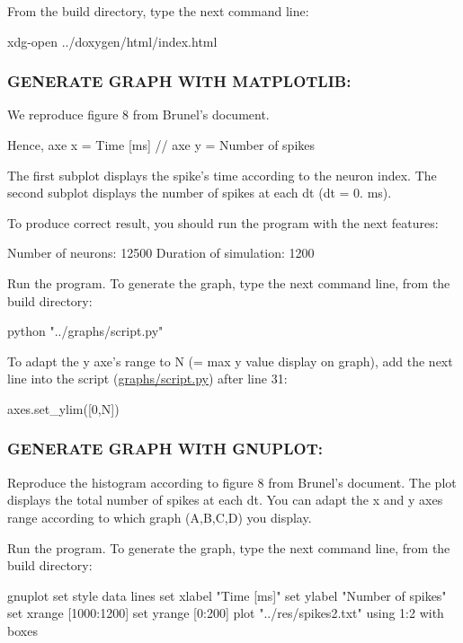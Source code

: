 From the build directory, type the next command line\-: \begin{DoxyVerb}    xdg-open ../doxygen/html/index.html
\end{DoxyVerb}


\subsubsection*{G\-E\-N\-E\-R\-A\-T\-E G\-R\-A\-P\-H W\-I\-T\-H M\-A\-T\-P\-L\-O\-T\-L\-I\-B\-:}

We reproduce figure 8 from Brunel's document.

Hence, axe x = Time \mbox{[}ms\mbox{]} // axe y = Number of spikes

The first subplot displays the spike's time according to the neuron index. The second subplot displays the number of spikes at each dt (dt = 0. ms).

To produce correct result, you should run the program with the next features\-: \begin{DoxyVerb}    Number of neurons: 12500
    Duration of simulation: 1200
\end{DoxyVerb}


Run the program. To generate the graph, type the next command line, from the build directory\-: \begin{DoxyVerb}    python "../graphs/script.py"
\end{DoxyVerb}


To adapt the y axe's range to N (= max y value display on graph), add the next line into the script (\hyperlink{script_8py}{graphs/script.\-py}) after line 31\-: \begin{DoxyVerb}    axes.set_ylim([0,N])
\end{DoxyVerb}


\subsubsection*{G\-E\-N\-E\-R\-A\-T\-E G\-R\-A\-P\-H W\-I\-T\-H G\-N\-U\-P\-L\-O\-T\-:}

Reproduce the histogram according to figure 8 from Brunel's document. The plot displays the total number of spikes at each dt. You can adapt the x and y axes range according to which graph (A,B,C,D) you display.

Run the program. To generate the graph, type the next command line, from the build directory\-: \begin{DoxyVerb}    gnuplot
    set style data lines
    set xlabel "Time [ms]"
    set ylabel "Number of spikes"
    set xrange [1000:1200]
    set yrange [0:200]
    plot "../res/spikes2.txt" using 1:2 with boxes
\end{DoxyVerb}


